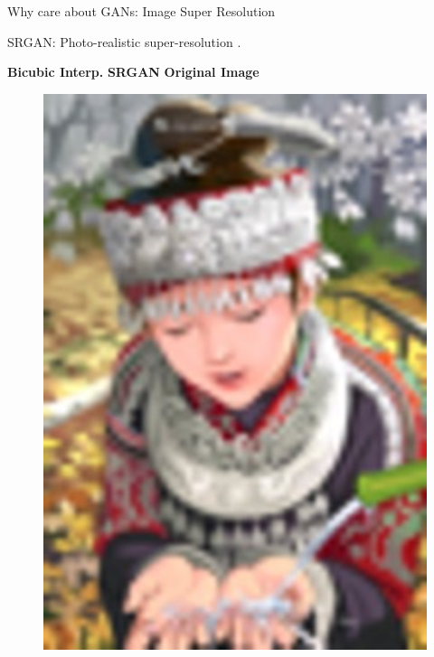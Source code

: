 \documentclass[notheorems]{beamer}
\begin{document}
    \begin{frame}{Why care about GANs: Image Super Resolution}

        \begin{center} SRGAN: Photo-realistic super-resolution \cite{ledig2017photo}. \end{center}

        \begin{center} \textbf{Bicubic Interp.} \hspace{1.1cm} \textbf{SRGAN} \hspace{1.1cm} \textbf{Original Image} \end{center}
        \begin{figure}
            \centering
            \begin{minipage}{.3\textwidth}
                \centering
                \includegraphics[width=1\textwidth]{figures/super_res/comic_SRF_4_bicubic}

\end{minipage}
\end{figure}
\end{frame}
\end{document}
